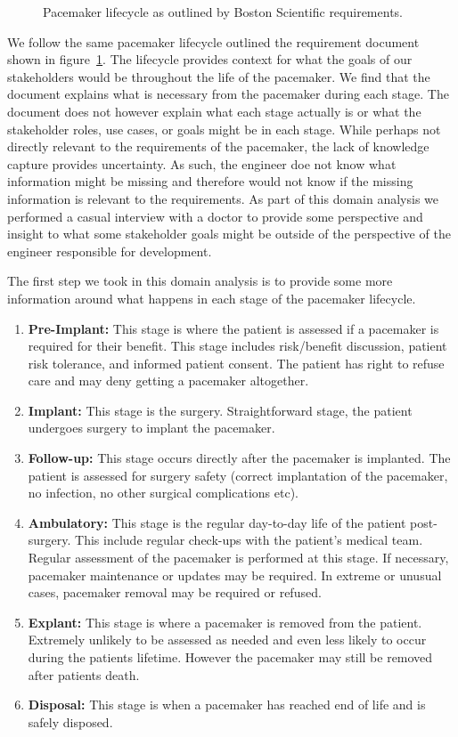 \begin{figure}
	\centering
	
	\caption{Pacemaker lifecycle as outlined by Boston Scientific requirements.}
	\label{fig:Pacemaker_lifecycle}
\end{figure}

We follow the same pacemaker lifecycle outlined the requirement document shown in figure~\ref{fig:Pacemaker_lifecycle}. The lifecycle provides context for what the goals of our stakeholders would be throughout the life of the pacemaker. We find that the document explains what is necessary from the pacemaker during each stage. The document does not however explain what each stage actually is or what the stakeholder roles, use cases, or goals might be in each stage. While perhaps not directly relevant to the requirements of the pacemaker, the lack of knowledge capture provides uncertainty. As such, the engineer doe not know what information might be missing and therefore would not know if the missing information is relevant to the requirements. As part of this domain analysis we performed a casual interview with a doctor to provide some perspective and insight to what some stakeholder goals might be outside of the perspective of the engineer responsible for development.

The first step we took in this domain analysis is to provide some more information around what happens in each stage of the pacemaker lifecycle.

\begin{enumerate}
	\item \textbf{Pre-Implant:} This stage is where the patient is assessed if a pacemaker is required for their benefit. This stage includes risk/benefit discussion, patient risk tolerance, and informed patient consent. The patient has right to refuse care and may deny getting a pacemaker altogether. 
	\item \textbf{Implant:} This stage is the surgery. Straightforward stage, the patient undergoes surgery to implant the pacemaker.
	\item \textbf{Follow-up:} This stage occurs directly after the pacemaker is implanted. The patient is assessed for surgery safety (correct implantation of the pacemaker, no infection, no other surgical complications etc).
	\item \textbf{Ambulatory:} This stage is the regular day-to-day life of the patient post-surgery. This include regular check-ups with the patient's medical team. Regular assessment of the pacemaker is performed at this stage. If necessary, pacemaker maintenance or updates may be required. In extreme or unusual cases, pacemaker removal may be required or refused.
	\item \textbf{Explant:} This stage is where a pacemaker is removed from the patient. Extremely unlikely to be assessed as needed and even less likely to occur during the patients lifetime. However the pacemaker may still be removed after patients death.
	\item \textbf{Disposal:} This stage is when a pacemaker has reached end of life and is safely disposed.
\end{enumerate}

